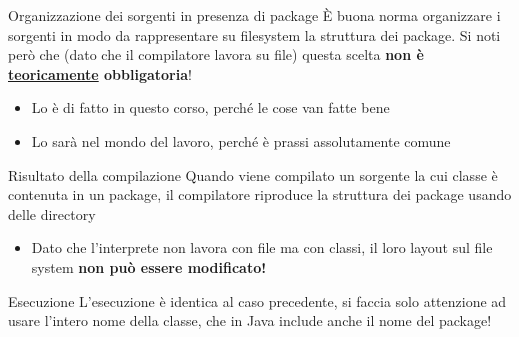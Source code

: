 \documentclass[presentation]{beamer}
\begin{document}
\begin{frame}{Organizzazione dei sorgenti in presenza di package}
        È buona norma organizzare i sorgenti in modo da rappresentare su filesystem la struttura 
dei package. Si noti però che (dato che il compilatore lavora su \alert{file}) questa scelta 
\textbf{non è \underline{teoricamente} obbligatoria}!
    \begin{itemize}
        \item Lo è di fatto in questo corso, perché le cose van fatte bene
        \item Lo sarà nel mondo del lavoro, perché è prassi assolutamente comune
    \end{itemize}
    \begin{block}{Risultato della compilazione}
        Quando viene compilato un sorgente la cui classe è contenuta in un package, il compilatore 
riproduce la struttura dei package usando delle directory
        \begin{itemize}
            \item Dato che l'interprete non lavora con file ma con \alert{classi}, il loro layout 
sul file system \textbf{non può essere modificato!} 
        \end{itemize}
    \end{block}
    \begin{block}{Esecuzione}
        L'esecuzione è identica al caso precedente, si faccia solo attenzione ad 
usare l'intero nome della classe, che in Java include anche il nome del package!
    \end{block}
\end{frame}
\end{document}
